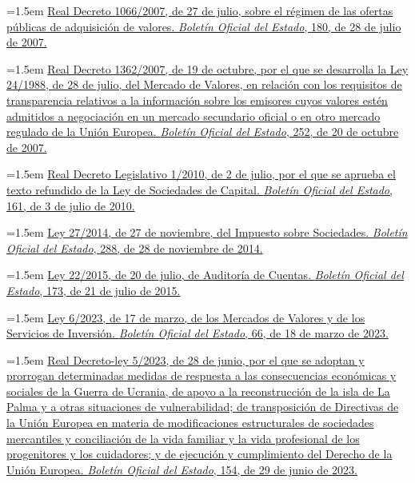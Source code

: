 \documentclass[10pt,a4paper]{article}
\begin{document}
\noindent\hangindent=1.5em \href{https://www.boe.es/eli/es/rd/2007/07/27/1066/con}{Real Decreto 1066/2007, de 27 de julio, sobre el régimen de las ofertas públicas de adquisición de valores. \textit{Boletín Oficial del Estado}, 180, de 28 de julio de 2007.}

\noindent\hangindent=1.5em \href{https://www.boe.es/eli/es/rd/2007/10/19/1362/con}{Real Decreto 1362/2007, de 19 de octubre, por el que se desarrolla la Ley 24/1988, de 28 de julio, del Mercado de Valores, en relación con los requisitos de transparencia relativos a la información sobre los emisores cuyos valores estén admitidos a negociación en un mercado secundario oficial o en otro mercado regulado de la Unión Europea. \textit{Boletín Oficial del Estado}, 252, de 20 de octubre de 2007.}

\noindent\hangindent=1.5em \href{https://www.boe.es/eli/es/rdlg/2010/07/02/1/con}{Real Decreto Legislativo 1/2010, de 2 de julio, por el que se aprueba el texto refundido de la Ley de Sociedades de Capital. \textit{Boletín Oficial del Estado}, 161, de 3 de julio de 2010.}

\noindent\hangindent=1.5em \href{https://www.boe.es/eli/es/l/2014/11/27/27/con}{Ley 27/2014, de 27 de noviembre, del Impuesto sobre Sociedades. \textit{Boletín Oficial del Estado}, 288, de 28 de noviembre de 2014.}

\noindent\hangindent=1.5em \href{https://www.boe.es/eli/es/l/2015/07/20/22/con}{Ley 22/2015, de 20 de julio, de Auditoría de Cuentas. \textit{Boletín Oficial del Estado}, 173, de 21 de julio de 2015.}

\noindent\hangindent=1.5em \href{https://www.boe.es/eli/es/l/2023/03/17/6/con}{Ley 6/2023, de 17 de marzo, de los Mercados de Valores y de los Servicios de Inversión. \textit{Boletín Oficial del Estado}, 66, de 18 de marzo de 2023.}

\noindent\hangindent=1.5em \href{https://www.boe.es/eli/es/rdl/2023/06/28/5/con}{Real Decreto-ley 5/2023, de 28 de junio, por el que se adoptan y prorrogan determinadas medidas de respuesta a las consecuencias económicas y sociales de la Guerra de Ucrania, de apoyo a la reconstrucción de la isla de La Palma y a otras situaciones de vulnerabilidad; de transposición de Directivas de la Unión Europea en materia de modificaciones estructurales de sociedades mercantiles y conciliación de la vida familiar y la vida profesional de los progenitores y los cuidadores; y de ejecución y cumplimiento del Derecho de la Unión Europea. \textit{Boletín Oficial del Estado}, 154, de 29 de junio de 2023.}
\end{document}
